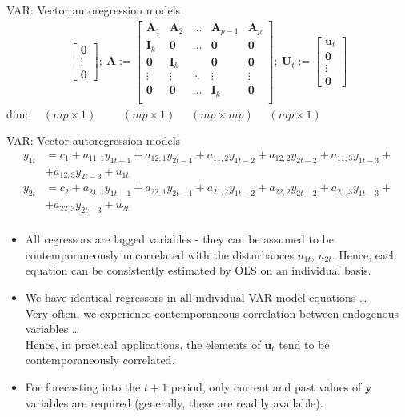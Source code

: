 \documentclass[usenames,dvipsnames]{beamer}
\begin{document}
\begin{frame}{VAR: Vector autoregression models}
\begin{align*}
\begin{bmatrix}
   \bm{0} \\
   \vdots \\
   \bm{0}
\end{bmatrix}
\!; \bm{~A} :=
\begin{bmatrix}
   \bm{A}_1 & \bm{A}_2 & \dots & \bm{A}_{p-1} & \bm{A}_p \\
   \bm{I}_k & \bm{0} & \dots & \bm{0} & \bm{0} \\
   \bm{0} & \bm{I}_k &   & \bm{0} & \bm{0} \\
   \vdots & \vdots & \ddots & \vdots & \vdots \\
   \bm{0} & \bm{0} & \dots & \bm{I}_k & \bm{0} \\
\end{bmatrix} \!; 
\bm{~U}_t := 
\begin{bmatrix}
   \bm{u}_t \\
   \bm{0} \\
   \vdots \\
   \bm{0}
\end{bmatrix}
\end{align*}
dim: ~~$(mp \times 1)$ \quad ~~~~$(mp \times 1)$ \qquad \qquad \qquad  ~~$(mp \times mp)$ \qquad  \qquad ~~$(mp \times 1)$
\end{frame}
\begin{frame}{VAR: Vector autoregression models}
\small
\vspace*{-5mm}
{\footnotesize
\begin{align*}
y_{1t} & = c_1 +  a_{11,1} y_{1t-1} + a_{12,1} y_{2t-1} + a_{11,2} y_{1t-2} + a_{12,2} y_{2t-2} + a_{11,3}  y_{1t-3} +\\
& + a_{12,3} y_{2t-3} + u_{1t}\\
y_{2t} & = c_2 +  a_{21,1} y_{1t-1} + a_{22,1} y_{2t-1} + a_{21,2} y_{1t-2} + a_{22,2} y_{2t-2} + a_{21,3}  y_{1t-3} +\\
& + a_{22,3} y_{2t-3} + u_{2t}\\
\end{align*}}
\vspace*{-9mm}
\begin{itemize}
\item All regressors are lagged variables - they can be assumed to be contemporaneously uncorrelated with the disturbances $u_{1t}$, $u_{2t}$. Hence, each equation can be consistently estimated by OLS on an individual basis.
\item We have identical regressors in all individual VAR model equations \dots \\
Very often, we experience contemporaneous correlation between endogenous variables \dots \\
Hence, in practical applications, the elements of $\bm{u}_t$ tend to be contemporaneously correlated. 
\item For forecasting into the $t+1$ period, only current and past values of $\bm{y}$ variables are required (generally, these are readily available).
\end{itemize}
\end{frame}
\end{document}
